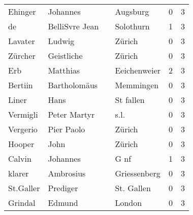 \documentclass[10pt,a4paper,landscape]{article}
\begin{document}
\begin{longtable}{llllrr}
                  Ehinger &                           Johannes &             &                                    Augsburg &          0 &         3 \\
                       de &                     BelliSvre Jean &             &                                   Solothurn &          1 &         3 \\
                  Lavater &                             Ludwig &             &                                      Zürich &          0 &         3 \\
                  Zürcher &                         Geistliche &             &                                      Zürich &          0 &         3 \\
                      Erb &                           Matthias &             &                                Eeichenweier &          2 &         3 \\
                  Bertiin &                       Bartholomäus &             &                                   Memmingen &          0 &         3 \\
                    Liner &                               Hans &             &                                   St fallen &          0 &         3 \\
                 Vermigli &                       Peter Martyr &             &                                        s.l. &          0 &         3 \\
                 Vergerio &                         Pier Paolo &             &                                      Zürich &          0 &         3 \\
                   Hooper &                               John &             &                                      Zürich &          0 &         3 \\
                   Calvin &                           Johannes &             &                                        G nf &          1 &         3 \\
                   klarer &                          Ambrosius &             &                                Griessenberg &          0 &         3 \\
                St.Galler &                           Prediger &             &                                  St. Gallen &          0 &         3 \\
                  Grindal &                             Edmund &             &                                      London &          0 &         3 \\

\end{longtable}
\end{document}

